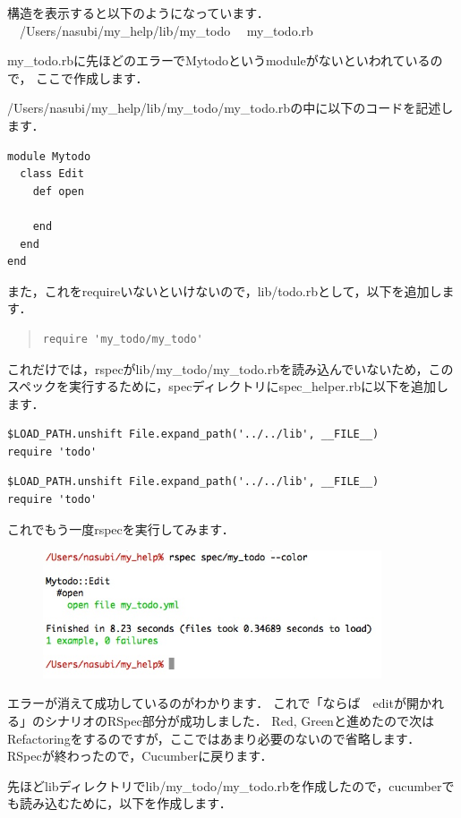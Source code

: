 構造を表示すると以下のようになっています．
　/Users/nasubi/my\_help/lib/my\_todo%
　my\_todo.rb

my\_todo.rbに先ほどのエラーでMytodoというmoduleがないといわれているので，
ここで作成します．

/Users/nasubi/my\_help/lib/my\_todo/my\_todo.rbの中に以下のコードを記述します．
\begin{lstlisting}[style=customCsh]
module Mytodo
  class Edit
    def open

    end
  end
end
\end{lstlisting}
また，これをrequireいないといけないので，lib/todo.rbとして，以下を追加します．
\begin{quote}\begin{verbatim}
require 'my_todo/my_todo'
\end{verbatim}\end{quote}
これだけでは，rspecがlib/my\_todo/my\_todo.rbを読み込んでいないため，このスペックを実行するために，specディレクトリにspec\_helper.rbに以下を追加します．
\begin{lstlisting}[style=customCsh]
$LOAD_PATH.unshift File.expand_path('../../lib', __FILE__)
require 'todo'
\end{lstlisting}\begin{lstlisting}[style=customRuby]
$LOAD_PATH.unshift File.expand_path('../../lib', __FILE__)
require 'todo'
\end{lstlisting}
これでもう一度rspecを実行してみます．

\begin{figure}[htbp]\begin{center}
\includegraphics[width=10cm,bb= 0 0 737 453]{../figs/./rspec2.jpg}
\caption{}
\label{default}\end{center}\end{figure}
エラーが消えて成功しているのがわかります．
これで「ならば　editが開かれる」のシナリオのRSpec部分が成功しました．
Red, Greenと進めたので次はRefactoringをするのですが，ここではあまり必要のないので省略します．
RSpecが終わったので，Cucumberに戻ります．

先ほどlibディレクトリでlib/my\_todo/my\_todo.rbを作成したので，cucumberでも読み込むために，以下を作成します．


